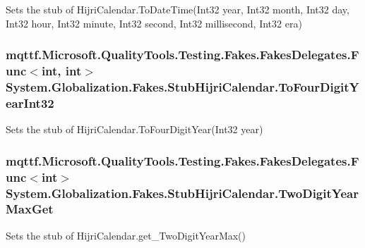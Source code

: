 Sets the stub of Hijri\-Calendar.\-To\-Date\-Time(\-Int32 year, Int32 month, Int32 day, Int32 hour, Int32 minute, Int32 second, Int32 millisecond, Int32 era)

\hypertarget{class_system_1_1_globalization_1_1_fakes_1_1_stub_hijri_calendar_a8d430d7360798c3b4ee7ce0994739593}{
\subsubsection[{To\-Four\-Digit\-Year\-Int32}]{\setlength{\rightskip}{0pt plus 5cm}mqttf.\-Microsoft.\-Quality\-Tools.\-Testing.\-Fakes.\-Fakes\-Delegates.\-Func$<$int, int$>$ System.\-Globalization.\-Fakes.\-Stub\-Hijri\-Calendar.\-To\-Four\-Digit\-Year\-Int32}}\label{class_system_1_1_globalization_1_1_fakes_1_1_stub_hijri_calendar_a8d430d7360798c3b4ee7ce0994739593}


Sets the stub of Hijri\-Calendar.\-To\-Four\-Digit\-Year(\-Int32 year)

\hypertarget{class_system_1_1_globalization_1_1_fakes_1_1_stub_hijri_calendar_a526e88333349da31a4e90a63a661bc3c}{
\subsubsection[{Two\-Digit\-Year\-Max\-Get}]{\setlength{\rightskip}{0pt plus 5cm}mqttf.\-Microsoft.\-Quality\-Tools.\-Testing.\-Fakes.\-Fakes\-Delegates.\-Func$<$int$>$ System.\-Globalization.\-Fakes.\-Stub\-Hijri\-Calendar.\-Two\-Digit\-Year\-Max\-Get}}\label{class_system_1_1_globalization_1_1_fakes_1_1_stub_hijri_calendar_a526e88333349da31a4e90a63a661bc3c}


Sets the stub of Hijri\-Calendar.\-get\-\_\-\-Two\-Digit\-Year\-Max()

